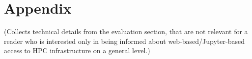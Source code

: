 \section{Appendix}

(Collects technical details from the evaluation section, that are not relevant for a reader who is interested only in being informed about web-based/Jupyter-based access to HPC infrastructure on a general level.)
